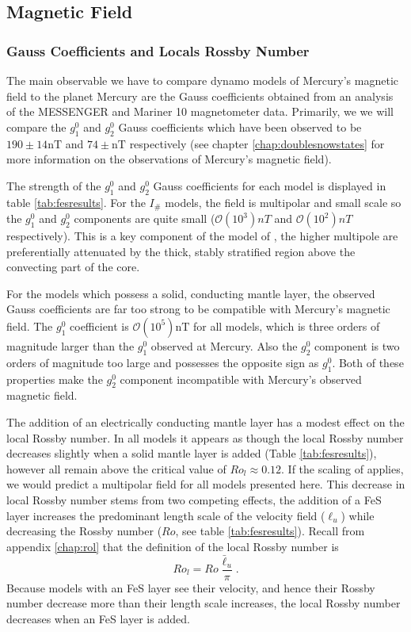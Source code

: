 \subsection{Magnetic Field}
\subsubsection{Gauss Coefficients and Locals Rossby Number}
The main observable we have to compare dynamo models of Mercury's magnetic field to the planet Mercury are the Gauss coefficients obtained from an analysis of the MESSENGER and Mariner 10 magnetometer data. Primarily, we we will compare the $g_1^0$ and $g_2^0$ Gauss coefficients which have been observed to be $190\pm14 \textrm{nT}$ and $74\pm \textrm{nT}$ respectively (see chapter \ref{chap:doublesnowstates} for more information on the observations of Mercury's magnetic field).

The strength of the $g_1^0$ and $g_2^0$ Gauss coefficients for each model is displayed in table \ref{tab:fesresults}. For the $I_{\#}$ models, the field is multipolar and small scale so the $g_1^0$ and $g_2^0$ components are quite small ($\mathcal{O}\left(10^{3}\right) nT$ and $\mathcal{O}\left(10^{2}\right) nT$ respectively). This is a key component of the model of \citet{christensen06}, the higher multipole are preferentially attenuated by the thick, stably stratified region above the convecting part of the core.

For the models which possess a solid, conducting mantle layer, the observed Gauss coefficients are far too strong to be compatible with Mercury's magnetic field. The $g_1^0$ coefficient is $\mathcal{O}\left(10^5\right) \textrm{nT}$ for all models, which is three orders of magnitude larger than the $g_1^0$ observed at Mercury. Also the $g_2^0$ component is two orders of magnitude too large and possesses the opposite sign as $g_1^0$. Both of these properties make the $g_2^0$ component incompatible with Mercury's observed magnetic field.

The addition of an electrically conducting mantle layer has a modest effect on the local Rossby number. In all models it appears as though the local Rossby number decreases slightly when a solid mantle layer is added (Table \ref{tab:fesresults}), however all remain above the critical value of $Ro_{l}\approx 0.12$. If the scaling of \citet{christensen06scaling} applies, we would predict a multipolar field for all models presented here. This decrease in local Rossby number stems from two competing effects, the addition of a FeS layer increases the predominant length scale of the velocity field ($\ell_u$) while decreasing the Rossby number ($Ro$, see table \ref{tab:fesresults}). Recall from appendix \ref{chap:rol} that the definition of the local Rossby number is
\begin{equation}
Ro_{l}=Ro\frac{\bar{\ell}_{u}}{\pi}.
\end{equation}
Because models with an FeS layer see their velocity, and hence their Rossby number decrease more than their length scale increases, the local Rossby number decreases when an FeS layer is added.

